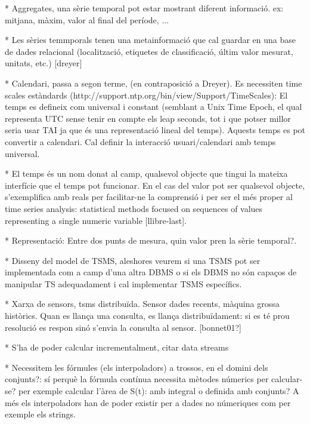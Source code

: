 * Aggregates, una sèrie temporal pot estar mostrant diferent informació. ex: mitjana, màxim, valor al final del període, ...

* Les sèries temmporals tenen una metainformació que cal guardar en una base de dades relacional (localització, etiquetes de classificació, últim valor mesurat, unitats, etc.) [dreyer]



* Calendari, passa a segon terme, (en contraposició a Dreyer). Es necessiten time scales estàndards (http://support.ntp.org/bin/view/Support/TimeScales): El temps es defineix com universal i constant (semblant a Unix Time Epoch, el qual representa UTC sense tenir en compte els leap seconds, tot i que potser millor seria usar TAI ja que és una representació lineal del temps). Aquests temps es pot convertir a calendari. Cal definir la interacció usuari/calendari amb temps universal.

* El temps és un nom donat al camp, qualsevol objecte que tingui la mateixa interfície que el temps pot funcionar. En el cas del valor pot ser qualsevol objecte, s'exemplifica amb reals per facilitar-ne la comprensió i per ser el més proper al time series analysis: statistical methods focused on sequences of values representing a single numeric variable [llibre-last].




* Representació: Entre dos punts de mesura, quin valor pren la sèrie temporal?.


* Disseny del model de TSMS, aleshores veurem si una TSMS pot ser implementada com a camp d'una altra DBMS o si els DBMS no són capaços de manipular TS adequadament i cal implementar TSMS específics.

* Xarxa de sensors, tsms distribuïda. Sensor dades recents, màquina grossa històrics. Quan es llança una consulta, es llança distribuïdament: si es té prou resolució es respon sinó s'envia la consulta al sensor. [bonnet01?]

* S'ha de poder calcular incrementalment, citar data streams

* Necessitem les fórmules (els interpoladors) a trossos, en el domini dels conjunts?: sí perquè la fórmula contínua necessita mètodes númerics per calcular-se? per exemple calcular l'àrea de S(t): amb integral o definida amb conjunts?
A més els interpoladors han de poder existir per a dades no númeriques com per exemple els strings.





